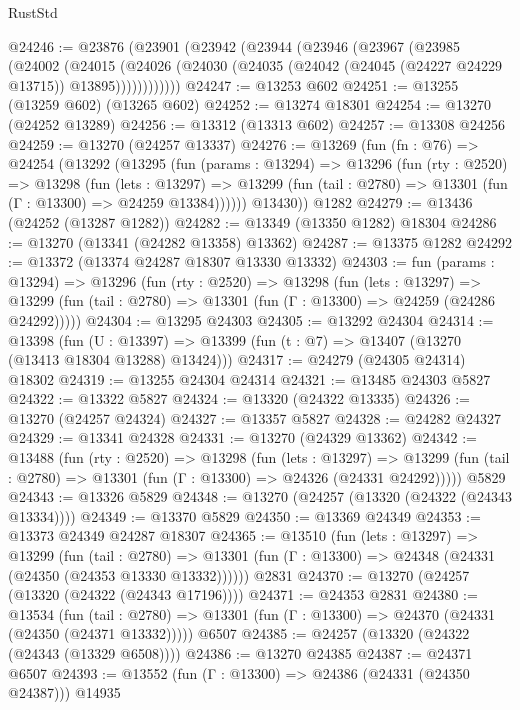 \begin{lexlean}{RustStd}
\begin{coremodule}
@24246 := @23876
    (@23901
      (@23942
        (@23944
          (@23946
            (@23967
              (@23985
                (@24002
                  (@24015
                    (@24026
                      (@24030 (@24035 (@24042 (@24045 (@24227 @24229 @13715)) @13895))))))))))))
@24247 := @13253 @602
@24251 := @13255 (@13259 @602) (@13265 @602)
@24252 := @13274 @18301
@24254 := @13270 (@24252 @13289)
@24256 := @13312 (@13313 @602)
@24257 := @13308 @24256
@24259 := @13270 (@24257 @13337)
@24276 := @13269
    (fun (fn : @76) =>
    @24254
      (@13292
        (@13295
          (fun (params : @13294) =>
          @13296
            (fun (rty : @2520) =>
            @13298
              (fun (lets : @13297) =>
              @13299 (fun (tail : @2780) => @13301 (fun (Γ : @13300) => @24259 @13384))))))
        @13430))
    @1282
@24279 := @13436 (@24252 (@13287 @1282))
@24282 := @13349 (@13350 @1282) @18304
@24286 := @13270 (@13341 (@24282 @13358) @13362)
@24287 := @13375 @1282
@24292 := @13372 (@13374 @24287 @18307 @13330 @13332)
@24303 := fun (params : @13294) =>
  @13296
    (fun (rty : @2520) =>
    @13298
      (fun (lets : @13297) =>
      @13299 (fun (tail : @2780) => @13301 (fun (Γ : @13300) => @24259 (@24286 @24292)))))
@24304 := @13295 @24303
@24305 := @13292 @24304
@24314 := @13398
    (fun (U : @13397) => @13399 (fun (t : @7) => @13407 (@13270 (@13413 @18304 @13288) @13424)))
@24317 := @24279 (@24305 @24314) @18302
@24319 := @13255 @24304 @24314
@24321 := @13485 @24303 @5827
@24322 := @13322 @5827
@24324 := @13320 (@24322 @13335)
@24326 := @13270 (@24257 @24324)
@24327 := @13357 @5827
@24328 := @24282 @24327
@24329 := @13341 @24328
@24331 := @13270 (@24329 @13362)
@24342 := @13488
    (fun (rty : @2520) =>
    @13298
      (fun (lets : @13297) =>
      @13299 (fun (tail : @2780) => @13301 (fun (Γ : @13300) => @24326 (@24331 @24292)))))
    @5829
@24343 := @13326 @5829
@24348 := @13270 (@24257 (@13320 (@24322 (@24343 @13334))))
@24349 := @13370 @5829
@24350 := @13369 @24349
@24353 := @13373 @24349 @24287 @18307
@24365 := @13510
    (fun (lets : @13297) =>
    @13299
      (fun (tail : @2780) =>
      @13301 (fun (Γ : @13300) => @24348 (@24331 (@24350 (@24353 @13330 @13332))))))
    @2831
@24370 := @13270 (@24257 (@13320 (@24322 (@24343 @17196))))
@24371 := @24353 @2831
@24380 := @13534
    (fun (tail : @2780) => @13301 (fun (Γ : @13300) => @24370 (@24331 (@24350 (@24371 @13332)))))
    @6507
@24385 := @24257 (@13320 (@24322 (@24343 (@13329 @6508))))
@24386 := @13270 @24385
@24387 := @24371 @6507
@24393 := @13552 (fun (Γ : @13300) => @24386 (@24331 (@24350 @24387))) @14935

\end{coremodule}
\end{lexlean}
